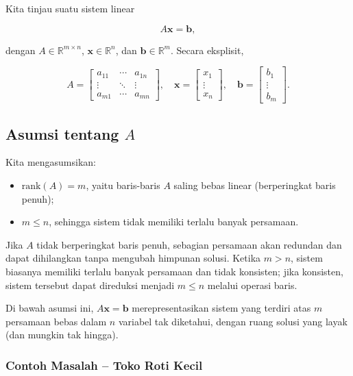 Kita tinjau suatu sistem linear

$$
A \mathbf{x} = \mathbf{b},
$$

dengan $A \in \mathbb{R}^{m \times n}$, $\mathbf{x} \in \mathbb{R}^n$, dan $\mathbf{b} \in \mathbb{R}^m$. Secara eksplisit,

$$
A =
\begin{bmatrix}
    a_{11} & \cdots & a_{1n} \\
    \vdots & \ddots & \vdots \\
    a_{m1} & \cdots & a_{mn}
\end{bmatrix}, \quad
\mathbf{x} =
\begin{bmatrix}
    x_1 \\
    \vdots \\
    x_n
\end{bmatrix}, \quad
\mathbf{b} =
\begin{bmatrix}
    b_1 \\
    \vdots \\
    b_m
\end{bmatrix}.
$$

\subsection*{Asumsi tentang $A$}

Kita mengasumsikan:
\begin{itemize}
\item $\text{rank}(A) = m$, yaitu baris-baris $A$ saling bebas linear (berperingkat baris penuh);
\item $m \leq n$, sehingga sistem tidak memiliki terlalu banyak persamaan.
\end{itemize}

Jika $A$ tidak berperingkat baris penuh, sebagian persamaan akan redundan dan dapat dihilangkan tanpa mengubah himpunan solusi. Ketika $m > n$, sistem biasanya memiliki terlalu banyak persamaan dan tidak konsisten; jika konsisten, sistem tersebut dapat direduksi menjadi $m \leq n$ melalui operasi baris.

Di bawah asumsi ini, $A\mathbf{x} = \mathbf{b}$ merepresentasikan sistem yang terdiri atas $m$ persamaan bebas dalam $n$ variabel tak diketahui, dengan ruang solusi yang layak (dan mungkin tak hingga).

\subsubsection{Contoh Masalah -- Toko Roti Kecil}
\label{sec:bakery-problem}

